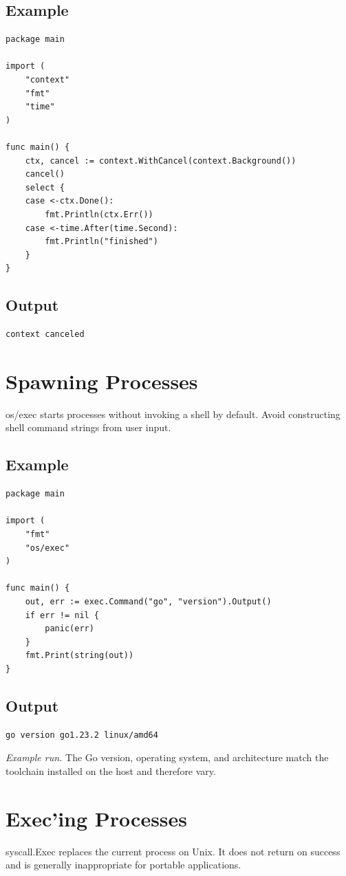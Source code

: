 \documentclass[10pt,oneside]{article}
\newcommand{\sectionline}{\par\vspace{4pt}{\color{rule}\hrule height .5pt}\vspace{7pt}\color{ink}\noindent}
\begin{document}
\subsection*{Example}
\begin{lstlisting}[style=gocode]
package main

import (
	"context"
	"fmt"
	"time"
)

func main() {
	ctx, cancel := context.WithCancel(context.Background())
	cancel()
	select {
	case <-ctx.Done():
		fmt.Println(ctx.Err())
	case <-time.After(time.Second):
		fmt.Println("finished")
	}
}
\end{lstlisting}
\subsection*{Output}
\begin{lstlisting}[style=terminal]
context canceled
\end{lstlisting}
\clearpage
\section{Spawning Processes}
\sectionline
os/exec starts processes without invoking a shell by default. Avoid constructing shell command strings from user input.\par
\subsection*{Example}
\begin{lstlisting}[style=gocode]
package main

import (
	"fmt"
	"os/exec"
)

func main() {
	out, err := exec.Command("go", "version").Output()
	if err != nil {
		panic(err)
	}
	fmt.Print(string(out))
}
\end{lstlisting}


\subsection*{Output}
\begin{lstlisting}[style=terminal]
go version go1.23.2 linux/amd64
\end{lstlisting}
\emph{Example run.} The Go version, operating system, and architecture match the toolchain installed on the host and therefore vary.
\clearpage
\section{Exec'ing Processes}
\sectionline
syscall.Exec replaces the current process on Unix. It does not return on success and is generally inappropriate for portable applications.\par
\end{document}
